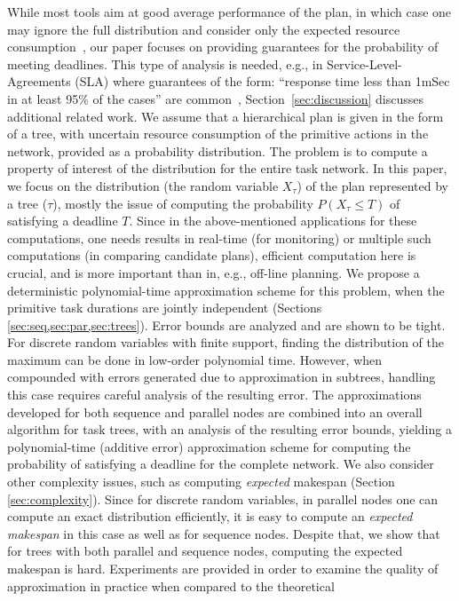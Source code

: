 \documentclass[review]{elsarticle}
\begin{document}
While most tools aim at good average performance of the plan, in which case one may ignore the 
full distribution and consider only the expected resource consumption~\cite{bonfietti2014disregarding}, our paper focuses
on providing guarantees for the probability of meeting deadlines. This type of analysis is needed, e.g., in
Service-Level-Agreements (SLA) where guarantees of the form: ``response time less than 1mSec in at least 95\% of the cases'' are common~\cite{buyya2011sla}, 
Section~\ref{sec:discussion} discusses additional related work.
We assume that a hierarchical plan is given in the form of a tree, with uncertain resource consumption of the primitive actions in the network, provided as a probability distribution. The problem is to compute a property of interest of the distribution for the entire task
 network. 
In this paper, we focus on the distribution 
(the random variable $X_\tau$) of the plan represented by a tree ($\tau$),
mostly the issue of computing the probability $P(X_\tau \leq T)$ of satisfying a deadline $T$. Since in the above-mentioned applications for these computations, one needs results in real-time (for monitoring) or multiple such computations (in comparing candidate plans), efficient computation here is crucial, and is more important than in, e.g., off-line planning.
We propose a deterministic polynomial-time approximation scheme for this problem, when the primitive task durations are jointly independent
(Sections \ref{sec:seq,sec:par,sec:trees}). 
Error bounds are analyzed and are shown to be tight. For discrete random variables with finite support, finding the distribution of the maximum can be done in low-order polynomial time. However, when compounded with errors generated due to approximation in subtrees, handling this case requires careful analysis of the resulting error. The approximations developed for both sequence and parallel nodes are combined into an overall algorithm for task trees, with an analysis of the resulting error bounds, yielding a polynomial-time (additive error) approximation scheme for computing the probability of satisfying a deadline for the complete network. 
We also consider other complexity issues, such as
computing {\em expected} makespan (Section \ref{sec:complexity}). Since for discrete random variables, in parallel nodes one can compute an exact distribution efficiently, it is easy to compute an {\em expected makespan} in this case as well as for sequence nodes. Despite that,  we show that for trees with both parallel and sequence nodes, computing the expected makespan is hard.
Experiments are provided in order to examine the quality of approximation in practice when compared to the theoretical 
\end{document}
